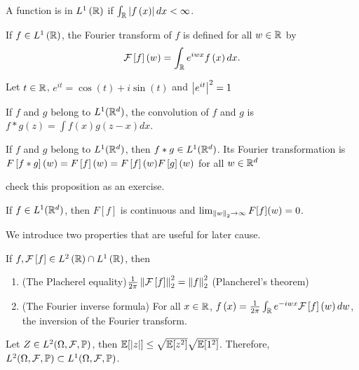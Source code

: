 \begin{definition} [$L^1\pa{\R}$ space]
        A function is in $L^1\pa{\R}$ if $\int_{\mathbb{R}} \left| f\left(x\right)\right|dx <\infty$.
\end{definition}
\begin{definition}
	If $f\in L^1\left(\mathbb{R}\right)$, the Fourier transform of $f$ is defined for all $w\in \mathbb{R}$ by
	\begin{equation*}
		\mathcal{F}\left[f\right]\left(w\right) = \int_{\mathbb{R}} e^{iwx} f\left(x\right)dx.
	\end{equation*}
\end{definition}
\begin{remark}
    Let $t\in \mathbb{R}$, $e^{it}=\cos(t)+i\sin(t)$ and $\left| e^{it}\right|^2=1$
\end{remark}
\begin{definition}[Convolution]
    If $f$ and $g$ belong to $L^1(\mathbb{R}^d)$, the convolution of $f$ and $g$ is $f\ast g(z)=\int f(x)g(z-x)dx$.
\end{definition}
\begin{proposition}
    If $f$ and $g$ belong to $L^1(\mathbb{R}^d)$, then $f\ast g \in L^1(\mathbb{R}^d)$. Its Fourier transformation is $F\left[f\ast g\right](w)=F\left[f\right](w)=F\left[f\right](w)F\left[g\right](w)$ for all $w\in \mathbb{R}^d$
\end{proposition}
\begin{remark}
    check this proposition as an exercise.
\end{remark}
\begin{proposition}
    If $f\in L^1(\mathbb{R}^d)$, then $F[f]$ is continuous and $\lim_{\left\| w \right\|_2 \to \infty} F[f](w)=0$.
\end{proposition}
We introduce two properties that are useful for later cause.
\begin{property}\label{prop:plancherel_inverse}
        If $f,\mathcal{F}\left[f\right]\in L^2\left(\mathbb{R}\right)\cap L^1\left(\mathbb{R}\right)$, then
        \begin{enumerate}
            \item (The Placherel equality)$\frac{1}{2\pi} \left\| \mathcal{F}\left[f\right] \right\|^2_2 = \left\| f \right\|^2_2$ (Plancherel's theorem)
            \item (The Fourier inverse formula) For all $x\in \mathbb{R}$, $f\left(x\right) = \frac{1}{2\pi} \int_{\mathbb{R}} e^{-iwx} \mathcal{F}\left[f\right]\left(w\right)dw$, the inversion of the Fourier transform.
        \end{enumerate}
\end{property}

\begin{question}
    Let $Z\in L^2(\Omega, \mathcal{F}, \mathbb{P})$, then $\mathbb{E} [\left| z\right|]\le\sqrt{\mathbb{E} [z^2]}\sqrt{\mathbb{E} [1^2]}$. Therefore, $L^2(\Omega, \mathcal{F}, \mathbb{P})\subset L^1(\Omega, \mathcal{F}, \mathbb{P})$.
\end{question}

